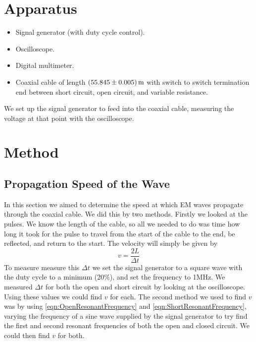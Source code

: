 \documentclass[12pt]{article}
\numberwithin{equation}{section}
\numberwithin{figure}{section}
\begin{document}
    \section{Apparatus}\label{sec:Apparatus}
    \begin{itemize}
        \item Signal generator (with duty cycle control).
        \item Oscilloscope.
        \item Digital multimeter.
        \item Coaxial cable of length $\SI{55.845\pm0.005}{\metre}$ with switch to switch termination 
        end between short circuit, open circuit, and variable resistance. 
    \end{itemize}
    We set up the signal generator to feed into the coaxial cable, measuring the voltage at that 
    point with the oscilloscope. 

    \section{Method}\label{sec:Method}
    \subsection{Propagation Speed of the Wave}\label{sec:PropagationSpeedMethod}
    In this section we aimed to determine the speed at which EM waves propagate through the 
    coaxial cable. We did this by two methods. \newline
    \newline
    Firstly we looked at the pulses. We know the length of the cable, so all we needed to do was 
    time how long it took for the pulse to travel from the start of the cable to the end, be 
    reflected, and return to the start. The velocity will simply be given by 
    \begin{equation}
        v=\frac{2L}{\Delta t}
        \label{eqn:PulseVelocity}
    \end{equation}
    To measure measure this $\Delta t$ we set the signal generator to a square wave with the 
    duty cycle to a minimum (20\%), and set the frequency to 1MHz. We measured $\Delta t$ for 
    both the open and short circuit by looking at the oscilloscope. Using these values we 
    could find $v$ for each. \newline
    \newline
    The second method we used to find $v$ was by using \autoref{eqn:OpenResonantFrequency} and 
    \autoref{eqn:ShortResonantFrequency}, varying the frequency of a sine wave supplied by the 
    signal generator to try find the first and second resonant frequencies of both the open and 
    closed circuit. We could then find $v$ for both. 
\end{document}
